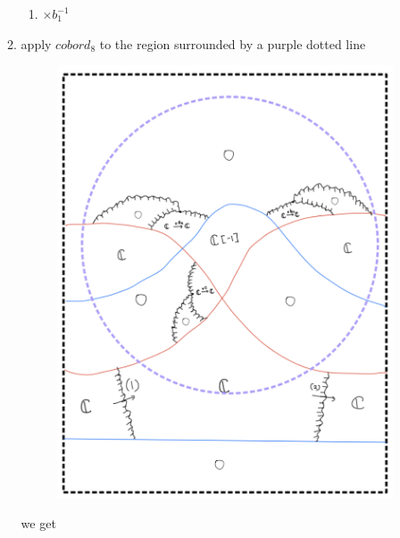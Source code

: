 \begin{enumerate}[label = (\roman*)]
\begin{enumerate}[label = (Step \arabic*)]
\begin{enumerate}[label = (\arabic*)]
\item $\times b_1^{-1}$
\end{enumerate}
\pagebreak
\item apply $cobord_8$ to the region surrounded by a purple dotted line
\begin{figure}[H]
    \centering
    \includegraphics[scale = 0.95]{diagrams/cobord_gen/base_5.png}
    \caption{}
    \label{fig:your-label}
\end{figure}
\pagebreak
we get
\begin{figure}[H]
    \centering

\end{figure}
\end{enumerate}
\end{enumerate}
